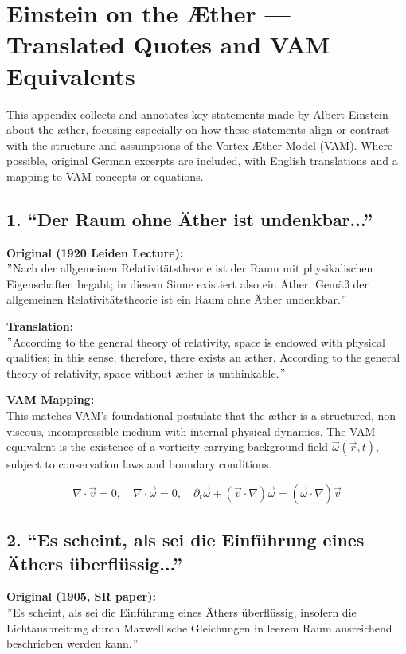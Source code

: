 \section{Einstein on the Æther — Translated Quotes and VAM Equivalents}

    This appendix collects and annotates key statements made by Albert Einstein about the æther, focusing especially on how these statements align or contrast with the structure and assumptions of the Vortex Æther Model (VAM). Where possible, original German excerpts are included, with English translations and a mapping to VAM concepts or equations.

    \subsection*{1. “Der Raum ohne Äther ist undenkbar...”}
    \textbf{Original (1920 Leiden Lecture):} \\
    \("\)Nach der allgemeinen Relativitätstheorie ist der Raum mit physikalischen Eigenschaften begabt; in diesem Sinne existiert also ein Äther. Gemäß der allgemeinen Relativitätstheorie ist ein Raum ohne Äther undenkbar.\("\)

    \textbf{Translation:} \\
    \("\)According to the general theory of relativity, space is endowed with physical qualities; in this sense, therefore, there exists an æther. According to the general theory of relativity, space without æther is unthinkable.\("\)

    \textbf{VAM Mapping:} \\
    This matches VAM's foundational postulate that the æther is a structured, non-viscous, incompressible medium with internal physical dynamics. The VAM equivalent is the existence of a vorticity-carrying background field \( \vec{\omega}(\vec{r}, t) \), subject to conservation laws and boundary conditions.

    \[
    \nabla \cdot \vec{v} = 0, \quad \nabla \cdot \vec{\omega} = 0, \quad \partial_t \vec{\omega} + (\vec{v} \cdot \nabla) \vec{\omega} = (\vec{\omega} \cdot \nabla) \vec{v}
    \]

    \subsection*{2. “Es scheint, als sei die Einführung eines Äthers überflüssig...”}
    \textbf{Original (1905, SR paper):} \\
    \("\)Es scheint, als sei die Einführung eines Äthers überflüssig, insofern die Lichtausbreitung durch Maxwell’sche Gleichungen in leerem Raum ausreichend beschrieben werden kann.\("\)

